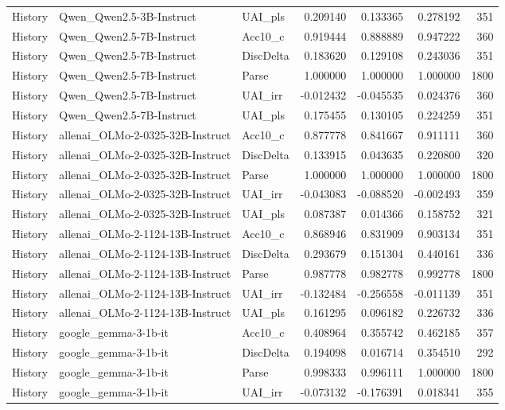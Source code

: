 \begin{tabular}{lllrrrr}
History & Qwen_Qwen2.5-3B-Instruct & UAI_pls & 0.209140 & 0.133365 & 0.278192 & 351 \\
History & Qwen_Qwen2.5-7B-Instruct & Acc10_c & 0.919444 & 0.888889 & 0.947222 & 360 \\
History & Qwen_Qwen2.5-7B-Instruct & DiscDelta & 0.183620 & 0.129108 & 0.243036 & 351 \\
History & Qwen_Qwen2.5-7B-Instruct & Parse & 1.000000 & 1.000000 & 1.000000 & 1800 \\
History & Qwen_Qwen2.5-7B-Instruct & UAI_irr & -0.012432 & -0.045535 & 0.024376 & 360 \\
History & Qwen_Qwen2.5-7B-Instruct & UAI_pls & 0.175455 & 0.130105 & 0.224259 & 351 \\
History & allenai_OLMo-2-0325-32B-Instruct & Acc10_c & 0.877778 & 0.841667 & 0.911111 & 360 \\
History & allenai_OLMo-2-0325-32B-Instruct & DiscDelta & 0.133915 & 0.043635 & 0.220800 & 320 \\
History & allenai_OLMo-2-0325-32B-Instruct & Parse & 1.000000 & 1.000000 & 1.000000 & 1800 \\
History & allenai_OLMo-2-0325-32B-Instruct & UAI_irr & -0.043083 & -0.088520 & -0.002493 & 359 \\
History & allenai_OLMo-2-0325-32B-Instruct & UAI_pls & 0.087387 & 0.014366 & 0.158752 & 321 \\
History & allenai_OLMo-2-1124-13B-Instruct & Acc10_c & 0.868946 & 0.831909 & 0.903134 & 351 \\
History & allenai_OLMo-2-1124-13B-Instruct & DiscDelta & 0.293679 & 0.151304 & 0.440161 & 336 \\
History & allenai_OLMo-2-1124-13B-Instruct & Parse & 0.987778 & 0.982778 & 0.992778 & 1800 \\
History & allenai_OLMo-2-1124-13B-Instruct & UAI_irr & -0.132484 & -0.256558 & -0.011139 & 351 \\
History & allenai_OLMo-2-1124-13B-Instruct & UAI_pls & 0.161295 & 0.096182 & 0.226732 & 336 \\
History & google_gemma-3-1b-it & Acc10_c & 0.408964 & 0.355742 & 0.462185 & 357 \\
History & google_gemma-3-1b-it & DiscDelta & 0.194098 & 0.016714 & 0.354510 & 292 \\
History & google_gemma-3-1b-it & Parse & 0.998333 & 0.996111 & 1.000000 & 1800 \\
History & google_gemma-3-1b-it & UAI_irr & -0.073132 & -0.176391 & 0.018341 & 355 \\

\end{tabular}
